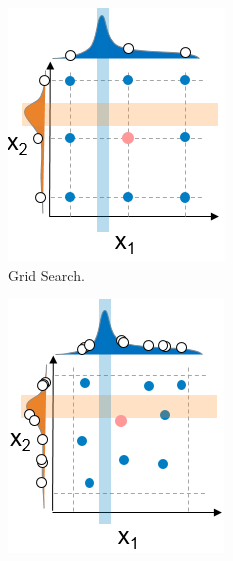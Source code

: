 \begin{figure}
	 \centering
	\begin{subfigure}[b]{0.25\linewidth}
		\includegraphics[width=\linewidth]{graphics/Background/hyperparameter-grid-search.png}
		\caption{Grid Search.}
		\label{bg: fig:automated parameter tuning approaches: grid}
	\end{subfigure}
	\begin{subfigure}[b]{0.25\linewidth}
		\includegraphics[width=\linewidth]{graphics/Background/hyperparameter-random-search.png}

\end{subfigure}
\end{figure}
